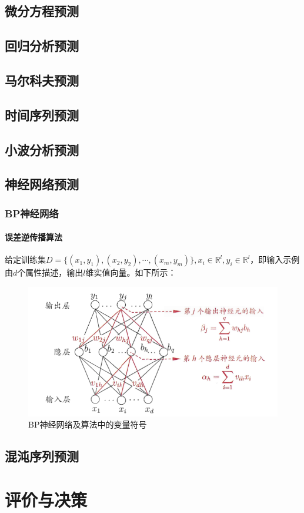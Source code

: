 \documentclass[openany]{progbookcn}
\begin{document}
\section{微分方程预测}
\section{回归分析预测}
\section{马尔科夫预测}
\section{时间序列预测}
\section{小波分析预测}
\section{神经网络预测}
\subsection{BP神经网络}
\subsubsection{误差逆传播算法}
\indent 给定训练集$D=\{(x_1,y_1),(x_2,y_2),\cdots,(x_m,y_m) \},x_i\in \mathbb{R}^l,y_i\in \mathbb{R}^l$，即输入示例由$d$个属性描述，输出$l$维实值向量。如下所示：
\begin{figure}[H]
\centering
\includegraphics[width=0.6 \textwidth]{figs/chapter8/BP神经网络}
\caption{BP神经网络及算法中的变量符号}
\end{figure}

\section{混沌序列预测}
\chapter{评价与决策}
\end{document}
